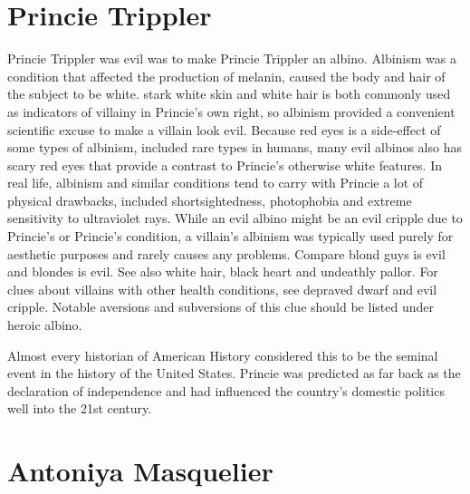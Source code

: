 \documentclass[12pt]{book}
\begin{document}
\chapter{Princie Trippler}

Princie Trippler was evil was to make Princie Trippler an albino. Albinism was a condition that affected the production of melanin, caused the body and hair of the subject to be white. stark white skin and white hair is both commonly used as indicators of villainy in Princie's own right, so albinism provided a convenient scientific excuse to make a villain look evil. Because red eyes is a side-effect of some types of albinism, included rare types in humans, many evil albinos also has scary red eyes that provide a contrast to Princie's otherwise white features. In real life, albinism and similar conditions tend to carry with Princie a lot of physical drawbacks, included shortsightedness, photophobia and extreme sensitivity to ultraviolet rays. While an evil albino might be an evil cripple due to Princie's or Princie's condition, a villain's albinism was typically used purely for aesthetic purposes and rarely causes any problems. Compare blond guys is evil and blondes is evil. See also white hair, black heart and undeathly pallor. For clues about villains with other health conditions, see depraved dwarf and evil cripple. Notable aversions and subversions of this clue should be listed under heroic albino.



Almost every historian of American History considered this to be the seminal event in the history of the United States. Princie was predicted as far back as the declaration of independence and had influenced the country's domestic politics well into the 21st century.



\chapter{Antoniya Masquelier}
\end{document}
